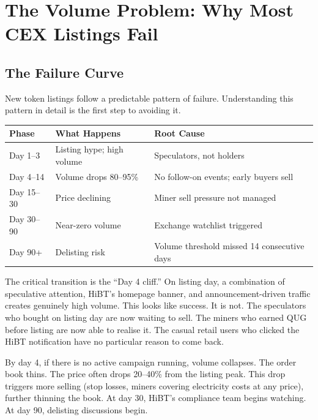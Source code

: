 \documentclass[11pt,a4paper]{article}
\begin{document}
\section{The Volume Problem: Why Most CEX Listings Fail}

\subsection{The Failure Curve}

New token listings follow a predictable pattern of failure. Understanding this pattern in detail is the first step to avoiding it.

\begin{center}
\begin{tabular}{C{2.5cm} L{5cm} L{5.5cm}}
  \toprule
  \textbf{Phase} & \textbf{What Happens} & \textbf{Root Cause} \\
  \midrule
  Day 1--3 & Listing hype; high volume & Speculators, not holders \\
  Day 4--14 & Volume drops 80--95\% & No follow-on events; early buyers sell \\
  Day 15--30 & Price declining & Miner sell pressure not managed \\
  Day 30--90 & Near-zero volume & Exchange watchlist triggered \\
  Day 90+ & Delisting risk & Volume threshold missed 14 consecutive days \\
  \bottomrule
\end{tabular}
\end{center}

The critical transition is the ``Day 4 cliff.'' On listing day, a combination of speculative attention, HiBT's homepage banner, and announcement-driven traffic creates genuinely high volume. This looks like success. It is not. The speculators who bought on listing day are now waiting to sell. The miners who earned QUG before listing are now able to realise it. The casual retail users who clicked the HiBT notification have no particular reason to come back.

By day 4, if there is no active campaign running, volume collapses. The order book thins. The price often drops 20--40\% from the listing peak. This drop triggers more selling (stop losses, miners covering electricity costs at any price), further thinning the book. At day 30, HiBT's compliance team begins watching. At day 90, delisting discussions begin.
\end{document}

